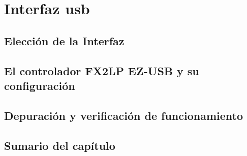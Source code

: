 \chapter{Interfaz \acrshort{usb}}
	
	\label{cap:cy}
	\section{Elección de la Interfaz}
		
	\section{El controlador FX2LP EZ-USB y su configuración}
		
%		
		
	\section{Depuración y verificación de funcionamiento}
		
	\section{Sumario del capítulo}
		